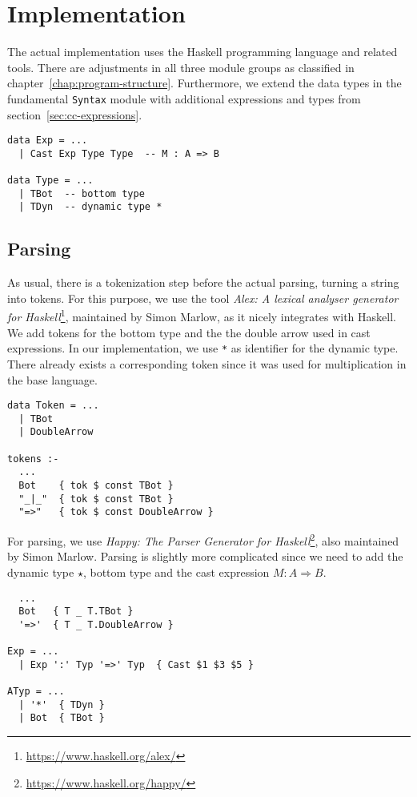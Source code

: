 \chapter{Implementation}\label{chap:implementation}

The actual implementation uses the Haskell programming language and related tools. There are adjustments in all three module groups as classified in chapter~\ref{chap:program-structure}. Furthermore, we extend the data types in the fundamental \texttt{Syntax} module with additional expressions and types from section~\ref{sec:cc-expressions}.

\begin{lstlisting}[caption=Extensions to \texttt{Syntax.hs}]
data Exp = ...
  | Cast Exp Type Type  -- M : A => B

data Type = ...
  | TBot  -- bottom type
  | TDyn  -- dynamic type *
\end{lstlisting}

\section{Parsing}

As usual, there is a tokenization step before the actual parsing, turning a string into tokens. For this purpose, we use the tool \emph{Alex: A lexical analyser generator for Haskell}\footnote{\url{https://www.haskell.org/alex/}}, maintained by Simon Marlow, as it nicely integrates with Haskell. We add tokens for the bottom type and the the double arrow used in cast expressions. In our implementation, we use \texttt{*} as identifier for the dynamic type. There already exists a corresponding token since it was used for multiplication in the base language.

\begin{lstlisting}[caption=Additional tokens (\texttt{Parsing/Tokens.x})]
data Token = ...
  | TBot
  | DoubleArrow

tokens :-
  ...
  Bot    { tok $ const TBot }
  "_|_"  { tok $ const TBot }
  "=>"   { tok $ const DoubleArrow }
\end{lstlisting}

For parsing, we use \emph{Happy: The Parser Generator for Haskell}\footnote{\url{https://www.haskell.org/happy/}}, also maintained by Simon Marlow. Parsing is slightly more complicated since we need to add the dynamic type $\star$, bottom type and the cast expression $M : A \Rightarrow B$.

\begin{lstlisting}[caption=Extensions to \texttt{Parsing/Grammar.y}]
%token
  ...
  Bot   { T _ T.TBot }
  '=>'  { T _ T.DoubleArrow }

Exp = ...
  | Exp ':' Typ '=>' Typ  { Cast $1 $3 $5 }

ATyp = ...
  | '*'  { TDyn }
  | Bot  { TBot }
\end{lstlisting}

